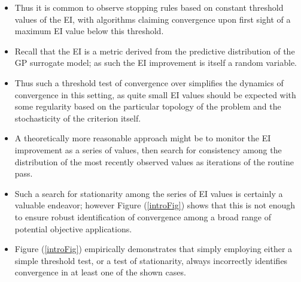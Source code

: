 \documentclass[12pt]{article}
\begin{document}
\begin{itemize}
	\item Thus it is common to observe stopping rules based on constant threshold values of the EI, with algorithms claiming convergence upon first sight of a maximum EI value below this threshold. 
	\item Recall that the EI is a metric derived from the predictive distribution of the GP surrogate model; as such the EI improvement is itself a random variable.
	\item Thus such a threshold test of convergence over simplifies the dynamics of convergence in this setting, as quite small EI values should be expected with some regularity based on the particular topology of the problem and the stochasticity of the criterion itself.
	\item A theoretically more reasonable approach might be to monitor the EI improvement as a series of values, then search for consistency among the distribution of the most recently observed values as iterations of the routine pass.
	\item Such a search for stationarity among the series of EI values is certainly a valuable endeavor; however Figure (\ref{introFig}) shows that this is not enough to ensure robust identification of convergence among a broad range of potential objective applications.
	\item Figure (\ref{introFig}) empirically demonstrates that simply employing either a simple threshold test, or a test of stationarity, always incorrectly identifies convergence in at least one of the shown cases.
\end{itemize}
\end{document}
